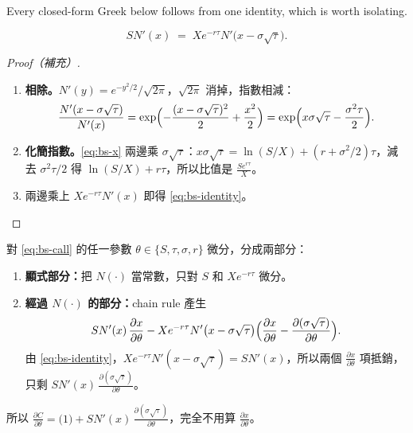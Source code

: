 Every closed-form Greek below follows from one identity, which is worth isolating.


\begin{lemma}[補充]
	\label{lem:bs-identity}
	\begin{equation}
		SN'(x) \;=\; Xe^{-r\tau}N'\bigl(x-\sigma\sqrt{\tau}\bigr) .
		\label{eq:bs-identity}
	\end{equation}
\end{lemma}

\begin{proof}[Proof（補充）]
	\begin{enumerate}[(1),nosep]
		\item \textbf{相除。}$N'(y)=e^{-y^{2}/2}/\sqrt{2\pi}$，$\sqrt{2\pi}$ 消掉，指數相減：
		\[
			\frac{N'(x-\sigma\sqrt{\tau})}{N'(x)}=\exp\Bigl(-\frac{(x-\sigma\sqrt{\tau})^{2}}{2}+\frac{x^{2}}{2}\Bigr)=\exp\Bigl(x\sigma\sqrt{\tau}-\frac{\sigma^{2}\tau}{2}\Bigr) .
		\]
		\item \textbf{化簡指數。}\eqref{eq:bs-x} 兩邊乘 $\sigma\sqrt{\tau}$：$x\sigma\sqrt{\tau}=\ln(S/X)+(r+\sigma^{2}/2)\tau$，減去 $\sigma^{2}\tau/2$ 得 $\ln(S/X)+r\tau$，所以比值是 $\frac{Se^{r\tau}}{X}$。
		\item 兩邊乘上 $Xe^{-r\tau}N'(x)$ 即得 \eqref{eq:bs-identity}。
	\end{enumerate}
\end{proof}

\begin{remark}
	\label{rem:greek-recipe}對 \eqref{eq:bs-call} 的任一參數 $\theta\in\{S,\tau,\sigma,r\}$ 微分，分成兩部分：
	\begin{enumerate}[(1),nosep]
		\item \textbf{顯式部分：}把 $N(\cdot)$ 當常數，只對 $S$ 和 $Xe^{-r\tau}$ 微分。
		\item \textbf{經過 $N(\cdot)$ 的部分：}chain rule 產生
		\[
			SN'(x)\,\frac{\partial x}{\partial\theta}-Xe^{-r\tau}N'\bigl(x-\sigma\sqrt{\tau}\bigr)\Bigl(\frac{\partial x}{\partial\theta}-\frac{\partial(\sigma\sqrt{\tau})}{\partial\theta}\Bigr) .
		\]
		由 \eqref{eq:bs-identity}，$Xe^{-r\tau}N'(x-\sigma\sqrt{\tau})=SN'(x)$，所以兩個 $\frac{\partial x}{\partial\theta}$ 項抵銷，只剩 $SN'(x)\,\frac{\partial(\sigma\sqrt{\tau})}{\partial\theta}$。
	\end{enumerate}
	所以 $\frac{\partial C}{\partial\theta}=\text{(1)}+SN'(x)\,\frac{\partial(\sigma\sqrt{\tau})}{\partial\theta}$，完全不用算 $\frac{\partial x}{\partial\theta}$。
\end{remark}
\suppend

